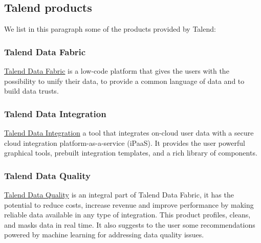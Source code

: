 \subsection*{Talend products}
We list in this paragraph some of the products provided by Talend:
\subsubsection*{Talend Data Fabric}
\href{https://www.talend.com/products/data-fabric/}{Talend Data Fabric} is a
low-code platform that gives the users with the possibility to unify their data,
to provide a common language of data and to build data trusts.

\subsubsection*{Talend Data Integration}
\href{https://www.talend.com/products/integrate-data/}{Talend Data Integration} 
a tool that integrates on-cloud user data with a secure cloud integration
platform-as-a-service (iPaaS). It provides the user powerful graphical
tools, prebuilt integration templates, and a rich library of components.

\subsubsection*{Talend Data Quality}
\href{https://www.talend.com/products/data-quality/}{Talend Data Quality} is an
integral part of Talend Data Fabric, it has the potential to reduce costs,
increase revenue and improve performance by making reliable data available in
any type of integration. This product profiles, cleans, and masks data in real
time. It also suggests to the user some recommendations powered by machine
learning for addressing data quality issues.






